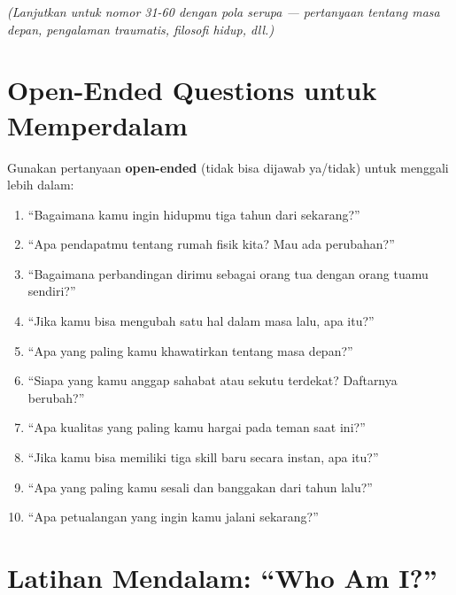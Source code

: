 \textit{(Lanjutkan untuk nomor 31-60 dengan pola serupa --- pertanyaan tentang masa depan, pengalaman traumatis, filosofi hidup, dll.)}

\section{Open-Ended Questions untuk Memperdalam}

\begin{tipbox}
Gunakan pertanyaan \textbf{open-ended} (tidak bisa dijawab ya/tidak) untuk menggali lebih dalam:

\begin{enumerate}
    \item ``Bagaimana kamu ingin hidupmu tiga tahun dari sekarang?''
    \item ``Apa pendapatmu tentang rumah fisik kita? Mau ada perubahan?''
    \item ``Bagaimana perbandingan dirimu sebagai orang tua dengan orang tuamu sendiri?''
    \item ``Jika kamu bisa mengubah satu hal dalam masa lalu, apa itu?''
    \item ``Apa yang paling kamu khawatirkan tentang masa depan?''
    \item ``Siapa yang kamu anggap sahabat atau sekutu terdekat? Daftarnya berubah?''
    \item ``Apa kualitas yang paling kamu hargai pada teman saat ini?''
    \item ``Jika kamu bisa memiliki tiga skill baru secara instan, apa itu?''
    \item ``Apa yang paling kamu sesali dan banggakan dari tahun lalu?''
    \item ``Apa petualangan yang ingin kamu jalani sekarang?''
\end{enumerate}
\end{tipbox}

\section{Latihan Mendalam: ``Who Am I?''}

